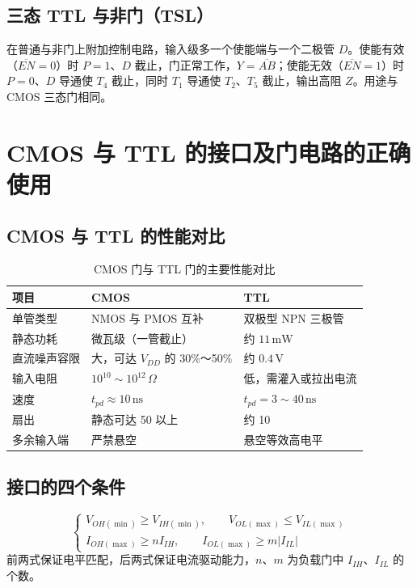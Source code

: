 \subsection{三态 TTL 与非门（TSL）}
在普通与非门上附加控制电路，输入级多一个使能端与一个二极管 \(D\)。使能有效（\(\overline{EN}=0\)）时 \(P=1\)、\(D\) 截止，门正常工作，\(Y=\overline{AB}\)；使能无效（\(\overline{EN}=1\)）时 \(P=0\)、\(D\) 导通使 \(T_4\) 截止，同时 \(T_1\) 导通使 \(T_2\)、\(T_5\) 截止，输出高阻 \(Z\)。用途与 CMOS 三态门相同。

\section{CMOS 与 TTL 的接口及门电路的正确使用}
\subsection{CMOS 与 TTL 的性能对比}
\begin{table}[!htbp]
    \centering
    \caption{CMOS 门与 TTL 门的主要性能对比}
    \begin{tabular}{lll}
        \toprule
        项目 & CMOS & TTL \\
        \midrule
        单管类型 & NMOS 与 PMOS 互补 & 双极型 NPN 三极管 \\
        静态功耗 & 微瓦级（一管截止） & 约 \(11\,\mathrm{mW}\) \\
        直流噪声容限 & 大，可达 \(V_{DD}\) 的 30\%～50\% & 约 \(0.4\,\mathrm{V}\) \\
        输入电阻 & \(10^{10}\sim10^{12}\,\Omega\) & 低，需灌入或拉出电流 \\
        速度 & \(t_{pd}\approx10\,\mathrm{ns}\) & \(t_{pd}=3\sim40\,\mathrm{ns}\) \\
        扇出 & 静态可达 50 以上 & 约 10 \\
        多余输入端 & 严禁悬空 & 悬空等效高电平 \\
        \bottomrule
    \end{tabular}
\end{table}

\subsection{接口的四个条件}
\[
\begin{cases}
V_{OH(\min)}\ge V_{IH(\min)},\qquad V_{OL(\max)}\le V_{IL(\max)}\\[4pt]
I_{OH(\max)}\ge nI_{IH},\qquad I_{OL(\max)}\ge m\left|I_{IL}\right|
\end{cases}
\]
前两式保证电平匹配，后两式保证电流驱动能力，\(n\)、\(m\) 为负载门中 \(I_{IH}\)、\(I_{IL}\) 的个数。

